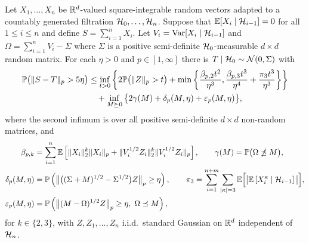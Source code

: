 \begin{lemma}%
  \label{lem:sa_martingale}

  Let $X_1, \ldots, X_n$ be $\R^d$-valued
  square-integrable random vectors
  adapted to a countably generated
  filtration $\cH_0, \ldots, \cH_n$.
  Suppose that
  $\E[X_i \mid \cH_{i-1}] = 0$ for all $1 \leq i \leq n$
  and define $S = \sum_{i=1}^n X_i$.
  Let $V_i = \Var[X_i \mid \cH_{i-1}]$ and
  $\Omega = \sum_{i=1}^n V_i - \Sigma$
  where $\Sigma$ is a positive semi-definite
  $\cH_0$-measurable $d \times d$ random matrix.
  For each $\eta > 0$ and $p \in [1,\infty]$
  there is $T \mid \cH_0 \sim \cN(0, \Sigma)$ with
  \begin{align*}
    \P\big(\|S-T\|_p > 5\eta\big)
    &\leq
    \inf_{t>0}
    \left\{
      2 \P\big( \|Z\|_p > t \big)
      + \min\left\{
        \frac{\beta_{p,2} t^2}{\eta^3},
        \frac{\beta_{p,3} t^3}{\eta^4}
        + \frac{\pi_3 t^3}{\eta^3}
      \right\}
    \right\} \\
    \nonumber
    &\quad+
    \inf_{M \succeq 0}
    \big\{ 2\gamma(M) + \delta_p(M,\eta)
    + \varepsilon_p(M, \eta)\big\},
  \end{align*}
  where the second infimum is over all positive semi-definite
  $d \times d$ non-random matrices, and
  \begin{align*}
    \beta_{p,k}
    &=
    \sum_{i=1}^n \E\left[\| X_i \|^k_2 \| X_i \|_p
    + \|V_i^{1/2} Z_i \|^k_2 \|V_i^{1/2} Z_i \|_p \right],
    \qquad\gamma(M)
    = \P\big(\Omega \npreceq M\big), \\
    \delta_p(M,\eta)
    &=
    \P\left(
      \big\|\big((\Sigma +M)^{1/2}- \Sigma^{1/2}\big) Z\big\|_p
      \geq \eta
    \right),
    \qquad\pi_3
    =
    \sum_{i=1}^{n+m}
    \sum_{|\kappa| = 3}
    \E \Big[ \big|
      \E \left[ X_i^\kappa \mid \cH_{i-1} \right]
    \big| \Big], \\
    \varepsilon_p(M, \eta)
    &=
    \P\left(\big\| (M - \Omega)^{1/2} Z \big\|_p\geq \eta, \
    \Omega \preceq M\right),
  \end{align*}
  for $k \in \{2,3\}$, with $Z, Z_1,\dots ,Z_n$ i.i.d.\ standard Gaussian
  on $\R^d$ independent of $\cH_n$.
\end{lemma}

